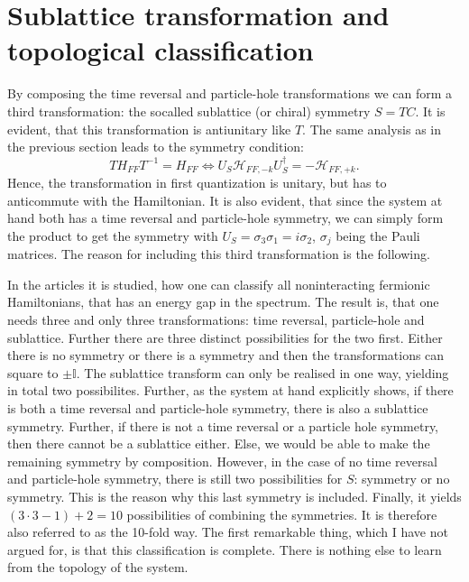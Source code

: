 \section{Sublattice transformation and topological classification}
By composing the time reversal and particle-hole transformations we can form a third transformation: the socalled sublattice (or chiral) symmetry $S = TC$. It is evident, that this transformation is antiunitary like $T$. The same analysis as in the previous section leads to the symmetry condition:
\begin{equation}
TH_{FF}T^{-1} = H_{FF} \Leftrightarrow U_S\mathcal{H}_{FF,-k} U^\dagger_S = - \mathcal{H}_{FF,+k}.
\end{equation}
Hence, the transformation in first quantization is unitary, but has to anticommute with the Hamiltonian. It is also evident, that since the system at hand both has a time reversal and particle-hole symmetry, we can simply form the product to get the symmetry with $U_S = \sigma_3\sigma_1 = i\sigma_2$, $\sigma_j$ being the Pauli matrices. The reason for including this third transformation is the following. 

In the articles \cite{Ludwig.Topology, Chiu.Topology} it is studied, how one can classify all noninteracting fermionic Hamiltonians, that has an energy gap in the spectrum. The result is, that one needs three and only three transformations: time reversal, particle-hole and sublattice. Further there are three distinct possibilities for the two first. Either there is no symmetry or there is a symmetry and then the transformations can square to $\pm \mathbb{I}$. The sublattice transform can only be realised in one way, yielding in total two possibilites. Further, as the system at hand explicitly shows, if there is both a time reversal and particle-hole symmetry, there is also a sublattice symmetry. Further, if there is not a time reversal or a particle hole symmetry, then there cannot be a sublattice either. Else, we would be able to make the remaining symmetry by composition. However, in the case of no time reversal and particle-hole symmetry, there is still two possibilities for $S$: symmetry or no symmetry. This is the reason why this last symmetry is included. Finally, it yields $(3\cdot 3 - 1) + 2 = 10$ possibilities of combining the symmetries. It is therefore also referred to as the 10-fold way. The first remarkable thing, which I have not argued for, is that this classification is complete. There is nothing else to learn from the topology of the system. 


